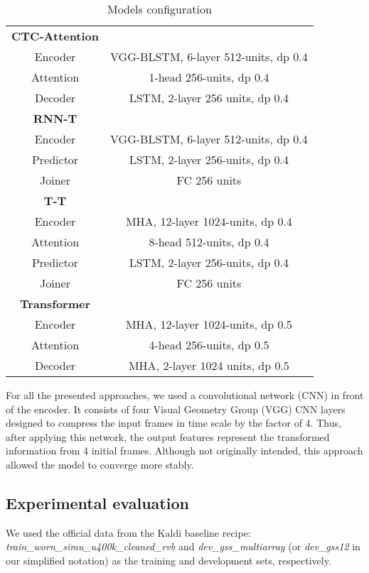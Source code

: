 \documentclass[a4paper]{article}
\begin{document}
\begin{table}[ht]
  \caption{Models configuration}
  \label{tab:models_configuration}
  \centering
  \begin{tabular}{c c}
    \toprule
    \textbf{CTC-Attention} \\
    Encoder &  VGG-BLSTM, 6-layer 512-units, dp 0.4\\
    Attention & 1-head 256-units, dp 0.4 \\
    Decoder &  LSTM, 2-layer 256 units, dp 0.4\\
    \midrule
    \textbf{RNN-T} \\
    Encoder &  VGG-BLSTM, 6-layer 512-units, dp 0.4\\
    Predictor & LSTM, 2-layer 256-units, dp 0.4 \\
    Joiner &  FC 256 units\\
    \midrule
    \textbf{T-T} \\
    Encoder &  MHA, 12-layer 1024-units, dp 0.4\\
    Attention & 8-head 512-units, dp 0.4 \\
    Predictor & LSTM, 2-layer 256-units, dp 0.4 \\
    Joiner &  FC 256 units\\
    \midrule
    \textbf{Transformer} \\
    Encoder &  MHA, 12-layer 1024-units, dp 0.5\\
    Attention & 4-head 256-units, dp 0.5 \\
    Decoder &  MHA, 2-layer 1024 units, dp 0.5 \\
    \bottomrule
  \end{tabular}
\end{table}

For all the presented approaches, we used a convolutional network (CNN) in front of the encoder. It consists of four Visual Geometry Group (VGG) CNN layers designed to compress the input frames in time scale by the factor of 4. Thus, after applying this network, the output features represent the transformed information from 4 initial frames. Although not originally intended, this approach allowed the model to converge more stably.

\subsection{Experimental evaluation}

We used the official data from the Kaldi baseline recipe: \textit{train\_worn\_simu\_u400k\_cleaned\_rvb} and \textit{dev\_gss\_multiarray} (or \textit{dev\_gss12} in our simplified notation) as the training and development sets, respectively.
\end{document}
